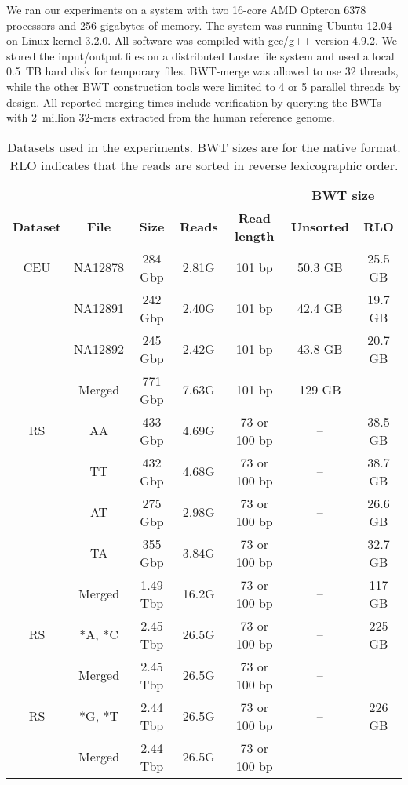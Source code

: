 \documentclass[smallabstract,smallcaptions]{dccpaper}
\newcommand{\BWT}{\textsf{BWT}}
\newcommand{\BWTmerge}{\textsf{BWT\nobreakdash-merge}}
\newcommand{\CEU}{\textsf{CEU}}
\newcommand{\RS}{\textsf{RS}}
\begin{document}

We ran our experiments on a system with two 16\nobreakdash-core AMD Opteron 6378 processors and 256 gigabytes of memory. The system was running Ubuntu 12.04 on Linux kernel 3.2.0. All software was compiled with gcc/g++ version 4.9.2. We stored the input/output files on a distributed Lustre file system and used a local 0.5~TB hard disk for temporary files. \BWTmerge{} was allowed to use 32 threads, while the other \BWT{} construction tools were limited to 4 or 5 parallel threads by design. All reported merging times include verification by querying the \BWT{}s with 2~million $32$\nobreakdash-mers extracted from the human reference genome.

\begin{table}[t!]
\begin{center}
\caption{Datasets used in the experiments. \BWT{} sizes are for the native format. RLO indicates that the reads are sorted in reverse lexicographic order.}\label{table:datasets}\smallskip%
{
\renewcommand{\baselinestretch}{1}\footnotesize
\begin{tabular}{cc|ccc|cc}
\hline
 & & & & & \multicolumn{2}{c}{\textbf{\BWT{} size}} \\
\textbf{Dataset} & \textbf{File} & \textbf{Size} & \textbf{Reads} & \textbf{Read length} & \textbf{Unsorted} & \textbf{RLO} \\
\hline
\CEU & NA12878 &  284 Gbp & 2.81G &       101 bp & 50.3 GB & 25.5 GB \\
     & NA12891 &  242 Gbp & 2.40G &       101 bp & 42.4 GB & 19.7 GB \\
     & NA12892 &  245 Gbp & 2.42G &       101 bp & 43.8 GB & 20.7 GB \\
     & Merged  &  771 Gbp & 7.63G &       101 bp &  129 GB & \\
\hline
\RS  & AA      &  433 Gbp & 4.69G & 73 or 100 bp &      -- & 38.5 GB \\
     & TT      &  432 Gbp & 4.68G & 73 or 100 bp &      -- & 38.7 GB \\
     & AT      &  275 Gbp & 2.98G & 73 or 100 bp &      -- & 26.6 GB \\
     & TA      &  355 Gbp & 3.84G & 73 or 100 bp &      -- & 32.7 GB \\
     & Merged  & 1.49 Tbp & 16.2G & 73 or 100 bp &      -- &  117 GB \\
\hline
\RS  & *A, *C  & 2.45 Tbp & 26.5G & 73 or 100 bp &      -- &  225 GB \\
     & Merged  & 2.45 Tbp & 26.5G & 73 or 100 bp &      -- & \\
\hline
\RS  & *G, *T  & 2.44 Tbp & 26.5G & 73 or 100 bp &      -- &  226 GB \\
     & Merged  & 2.44 Tbp & 26.5G & 73 or 100 bp &      -- & \\
\hline
\end{tabular}}
\end{center}
\end{table}
\end{document}
